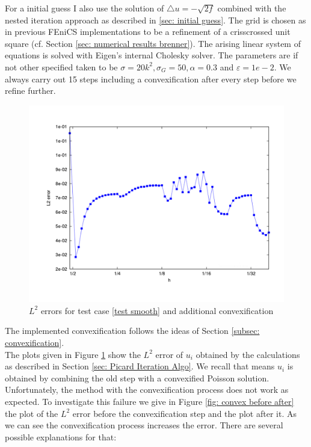 For a initial guess I also use the solution of $\triangle u = -\sqrt{2f}$ combined with the nested iteration approach as described in \ref{sec: initial guess}. The grid is chosen as in previous FEniCS implementations to be a refinement of a crisscrossed unit square (cf. Section \ref{sec: numerical results brenner}).
The arising linear system of equations is solved with Eigen's internal Cholesky solver.
The parameters are if not other specified taken to be $\sigma=20 k^2, \sigma_G = 50, \alpha =
0.3$ and $\varepsilon = 1e-2$. We always carry out 15 steps including a convexification after every step before we refine further.
\begin{figure}[H]
\centering
	\includegraphics[scale =0.4]{plots/MA1_convexify.pdf}
	\caption{$L^2$ errors for test case \ref{test smooth} and additional convexification}
	\label{fig: l2 errors test smooth ourMethodConvex}
\end{figure}
The implemented convexification follows the ideas of Section \ref{subsec: convexification}. \\
The plots given in Figure \ref{fig: l2 errors test smooth ourMethodConvex} show the $L^2$ error of $u_i$ obtained by the calculations as described in Section \ref{sec: Picard Iteration Algo}. We recall that means $u_i$ is obtained by combining the old step with a convexified Poisson solution. Unfortunately, the method with the convexification process does not work as expected.
To investigate this failure we give in Figure \ref{fig: convex before after} the plot of the $L^2$ error before the convexification step and the plot after it. As we can see the convexification process increases the error. There are several possible explanations for that:

